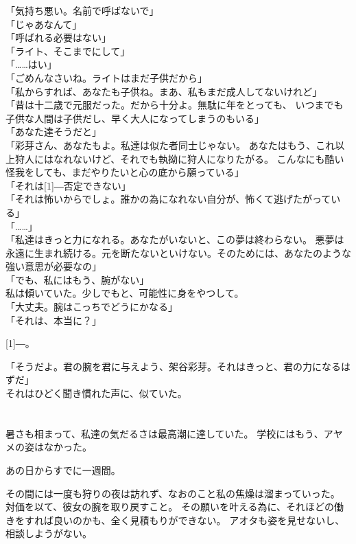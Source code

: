 \documentclass[../IHMain]{subfiles}
\begin{document}
「気持ち悪い。名前で呼ばないで」\\
「じゃあなんて」\\
「呼ばれる必要はない」\\
「ライト、そこまでにして」\\
「……はい」\\
「ごめんなさいね。ライトはまだ子供だから」\\
「私からすれば、あなたも子供ね。まあ、私もまだ成人してないけれど」\\
「昔は十二歳で元服だった。だから十分よ。無駄に年をとっても、
いつまでも子供な人間は子供だし、早く大人になってしまうのもいる」\\
「あなた達そうだと」\\
「彩芽さん、あなたもよ。私達は似た者同士じゃない。
あなたはもう、これ以上狩人にはなれないけど、それでも執拗に狩人になりたがる。
こんなにも酷い怪我をしても、まだやりたいと心の底から願っている」\\
「それは\scalebox{3}[1]{―}否定できない」\\
「それは怖いからでしょ。誰かの為になれない自分が、怖くて逃げたがっている」\\
「……」\\
「私達はきっと力になれる。あなたがいないと、この夢は終わらない。
悪夢は永遠に生まれ続ける。元を断たないといけない。そのためには、あなたのような強い意思が必要なの」\\
「でも、私にはもう、腕がない」\\
私は傾いていた。少しでもと、可能性に身をやつして。\\
「大丈夫。腕はこっちでどうにかなる」\\
「それは、本当に？」

\scalebox{3}[1]{―}。

「そうだよ。君の腕を君に与えよう、架谷彩芽。それはきっと、君の力になるはずだ」\\
それはひどく聞き慣れた声に、似ていた。

\section{}
暑さも相まって、私達の気だるさは最高潮に達していた。
学校にはもう、アヤメの姿はなかった。

あの日からすでに一週間。

その間には一度も狩りの夜は訪れず、なおのこと私の焦燥は溜まっていった。
対価を以て、彼女の腕を取り戻すこと。
その願いを叶える為に、それほどの働きをすれば良いのかも、全く見積もりができない。
アオタも姿を見せないし、相談しようがない。
\end{document}
